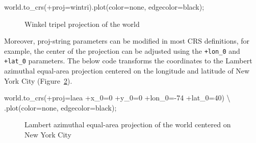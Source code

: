 \documentclass[
  letterpaper,
]{krantz}
\newenvironment{Shaded}{\begin{snugshade}}{\end{snugshade}}
\newcommand{\NormalTok}[1]{\textcolor[rgb]{0.00,0.23,0.31}{#1}}
\newcommand{\OperatorTok}[1]{\textcolor[rgb]{0.37,0.37,0.37}{#1}}
\newcommand{\StringTok}[1]{\textcolor[rgb]{0.13,0.47,0.30}{#1}}
\begin{document}
\begin{Shaded}
\begin{Highlighting}[]
\NormalTok{world.to\_crs(}\StringTok{\textquotesingle{}+proj=wintri\textquotesingle{}}\NormalTok{).plot(color}\OperatorTok{=}\StringTok{\textquotesingle{}none\textquotesingle{}}\NormalTok{, edgecolor}\OperatorTok{=}\StringTok{\textquotesingle{}black\textquotesingle{}}\NormalTok{)}\OperatorTok{;}
\end{Highlighting}
\end{Shaded}

\begin{figure}[H]


\caption{\label{fig-wintri}Winkel tripel projection of the world}

\end{figure}%

Moreover, proj-string parameters can be modified in most CRS
definitions, for example, the center of the projection can be adjusted
using the \texttt{+lon\_0} and \texttt{+lat\_0} parameters. The below
code transforms the coordinates to the Lambert azimuthal equal-area
projection centered on the longitude and latitude of New York City
(Figure~\ref{fig-azimuthal-equal-area}).

\begin{Shaded}
\begin{Highlighting}[]
\NormalTok{world.to\_crs(}\StringTok{\textquotesingle{}+proj=laea +x\_0=0 +y\_0=0 +lon\_0={-}74 +lat\_0=40\textquotesingle{}}\NormalTok{) }\OperatorTok{\textbackslash{}}
\NormalTok{    .plot(color}\OperatorTok{=}\StringTok{\textquotesingle{}none\textquotesingle{}}\NormalTok{, edgecolor}\OperatorTok{=}\StringTok{\textquotesingle{}black\textquotesingle{}}\NormalTok{)}\OperatorTok{;}
\end{Highlighting}
\end{Shaded}

\begin{figure}[H]


\caption{\label{fig-azimuthal-equal-area}Lambert azimuthal equal-area
projection of the world centered on New York City}

\end{figure}%
\end{document}
